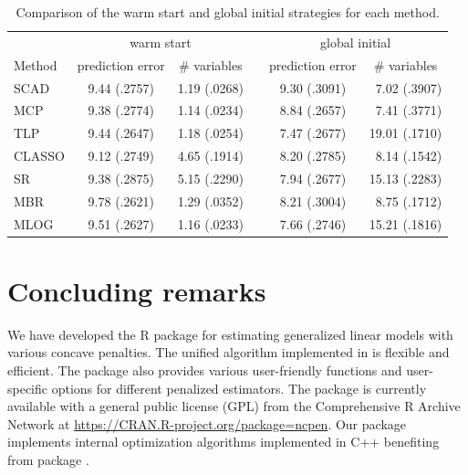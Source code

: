 \begin{table}[h!]
\begin{center}
\caption{Comparison of the warm start and global initial strategies for each method.} \small
\begin{tabular}{lccccr}
\hline
&  \multicolumn{2}{c}{warm start} &&\multicolumn{2}{c}{global initial} \\
\cline{2-3}\cline{5-6}
Method &\multicolumn{1}{c}{prediction error} &\multicolumn{1}{c}{\# variables}
       &&\multicolumn{1}{c}{prediction error} &\multicolumn{1}{c}{\# variables} \\

\hline
SCAD   &9.44 (.2757)     &1.19 (.0268)       &&9.30 (.3091)   & 7.02 (.3907) \\
MCP    &9.38 (.2774)     &1.14 (.0234)       &&8.84 (.2657)   & 7.41 (.3771) \\
TLP    &9.44 (.2647)     &1.18 (.0254)       &&7.47 (.2677)   &19.01 (.1710) \\
CLASSO &9.12 (.2749)     &4.65 (.1914)       &&8.20 (.2785)   & 8.14 (.1542) \\
SR     &9.38 (.2875)     &5.15 (.2290)       &&7.94 (.2677)   &15.13 (.2283) \\
MBR    &9.78 (.2621)     &1.29 (.0352)       &&8.21 (.3004)   & 8.75 (.1712) \\
MLOG   &9.51 (.2627)     &1.16 (.0233)       &&7.66 (.2746)   &15.21 (.1816) \\
\hline
\end{tabular}\label{tab:loc}
\end{center}
\end{table}



\section{Concluding remarks}
We have developed the R package  for estimating generalized linear models with various concave penalties.
The unified algorithm implemented in  is flexible and efficient.
The package also provides various user-friendly functions and user-specific options for different penalized estimators.
The package is currently available with a general public license (GPL) from the Comprehensive R Archive Network at
\url{https://CRAN.R-project.org/package=ncpen}.
Our  package implements internal optimization algorithms implemented in C++ benefiting from  package \citep{eddelbuettel2011rcpp}.

